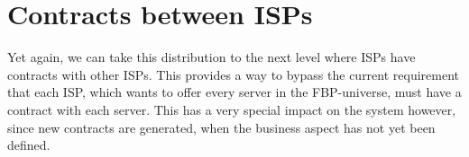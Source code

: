 \section{Contracts between ISPs}
Yet again, we can take this distribution to the next level where ISPs have contracts with other ISPs. This provides a way to bypass the current requirement that each ISP, which wants to offer every server in the FBP-universe, must have a contract with each server. This has a very special impact on the system however, since new contracts are generated, when the business aspect has not yet been defined.\\


